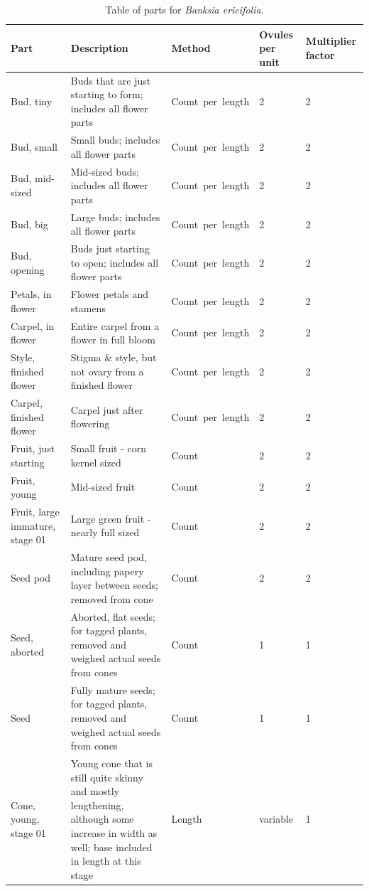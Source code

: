 \documentclass[10pt,twoside]{article}\usepackage[]{graphicx}\usepackage[]{color}
\begin{document}
\clearpage
\begingroup\small
\begin{longtable}{p{4.5cm}p{6cm}p{2cm}p{1cm}p{1cm}}
\caption{Table of parts for \emph{Banksia ericifolia}.} \\ 
  \hline
Part & Description & Method & Ovules per unit & Multiplier factor \\ 
  \hline
Bud, tiny & Buds that are just starting to form; includes all flower parts & Count\ per\ length & 2 &   2 \\ 
  Bud, small & Small buds; includes all flower parts & Count\ per\ length & 2 &   2 \\ 
  Bud, mid-sized & Mid-sized buds; includes all flower parts & Count\ per\ length & 2 &   2 \\ 
  Bud, big & Large buds; includes all flower parts & Count\ per\ length & 2 &   2 \\ 
  Bud, opening & Buds just starting to open; includes all flower parts & Count\ per\ length & 2 &   2 \\ 
  Petals, in flower & Flower petals and stamens & Count\ per\ length & 2 &   2 \\ 
  Carpel, in flower & Entire carpel from a flower in full bloom & Count\ per\ length & 2 &   2 \\ 
  Style, finished flower & Stigma \& style, but not ovary from a finished flower & Count\ per\ length & 2 &   2 \\ 
  Carpel, finished flower & Carpel just after flowering & Count\ per\ length & 2 &   2 \\ 
  Fruit, just starting & Small fruit - corn kernel sized & Count & 2 &   2 \\ 
  Fruit, young & Mid-sized fruit & Count & 2 &   2 \\ 
  Fruit, large immature, stage 01 & Large green fruit - nearly full sized & Count & 2 &   2 \\ 
  Seed pod & Mature seed pod, including papery layer between seeds; removed from cone & Count & 2 &   2 \\ 
  Seed, aborted & Aborted, flat seeds; for tagged plants, removed and weighed actual seeds from cones & Count & 1 &   1 \\ 
  Seed & Fully mature seeds; for tagged plants, removed and weighed actual seeds from cones & Count & 1 &   1 \\ 
  Cone, young, stage 01 & Young cone that is still quite skinny and mostly lengthening, although some increase in width as well; base included in length at this stage & Length & variable &   1 \\ 

\end{longtable}
\end{document}
